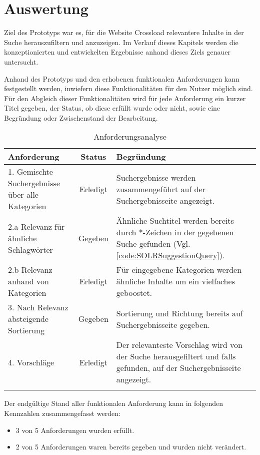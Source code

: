 \chapter{Auswertung}
\label{ch:evaluation}
Ziel des Prototyps war es, für die Website Crossload relevantere Inhalte in der Suche herauszufiltern und anzuzeigen.
Im Verlauf dieses Kapitels werden die konzeptionierten und entwickelten Ergebnisse anhand dieses Ziels genauer untersucht.

Anhand des Prototyps und den erhobenen funktionalen Anforderungen kann festgestellt werden, inwiefern diese Funktionalitäten für den Nutzer möglich sind.
Für den Abgleich dieser Funktionalitäten wird für jede Anforderung ein kurzer Titel gegeben, der Status, ob diese erfüllt wurde oder nicht, sowie eine Begründung oder Zwischenstand der Bearbeitung.

\begin{longtable}{p{}|c|p{}}
  \label{tab:requirements}\\
  \textbf{Anforderung} & \textbf{Status} & \textbf{Begründung} \\
  \hline
  \hline
  1. Gemischte Suchergebnisse über alle Kategorien & Erledigt & Suchergebnisse werden zusammengeführt auf der Suchergebnisseite angezeigt. \\
  \hline

  2.a Relevanz für ähnliche Schlagwörter & Gegeben & Ähnliche Suchtitel werden bereits durch *-Zeichen in der gegebenen Suche gefunden (Vgl. \ref{code:SOLRSuggestionQuery}). \\
  \hline

  2.b Relevanz anhand von Kategorien & Erledigt & Für eingegebene Kategorien werden ähnliche Inhalte um ein vielfaches geboostet. \\
  \hline

  3. Nach Relevanz absteigende Sortierung & Gegeben & Sortierung und Richtung bereits auf Suchergebnisseite gegeben. \\
  \hline

  4. Vorschläge & Erledigt & Der relevanteste Vorschlag wird von der Suche herausgefiltert und falls gefunden, auf der Suchergebnisseite angezeigt. \\
  \caption{Anforderungsanalyse}
\end{longtable}

Der endgültige Stand aller funktionalen Anforderung kann in folgenden Kennzahlen zusammengefasst werden:
\begin{itemize}
  \item 3 von 5 Anforderungen wurden erfüllt.
  \item 2 von 5 Anforderungen waren bereits gegeben und wurden nicht verändert.
\end{itemize}
